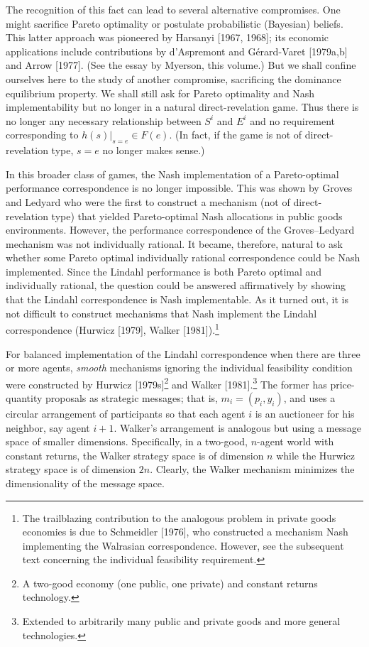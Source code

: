 \documentclass[12pt, letterpaper]{article}
\begin{document}
The recognition of this fact can lead to several alternative compromises. One might sacrifice Pareto optimality or postulate probabilistic (Bayesian) beliefs. This latter approach was pioneered by Harsanyi [1967, 1968]; its economic applications include contributions by d'Aspremont and Gérard-Varet [1979a,b] and Arrow [1977]. (See the essay by Myerson, this volume.) But we shall confine ourselves here to the study of another compromise, sacrificing the dominance equilibrium property. We shall still ask for Pareto optimality and Nash implementability but no longer in a natural direct-revelation game. Thus there is no longer any necessary relationship between $S^i$ and $E^i$ and no requirement corresponding to $h(s)|_{s=e} \in F(e)$. (In fact, if the game is not of direct-revelation type, $s = e$ no longer makes sense.)

In this broader class of games, the Nash implementation of a Pareto-optimal performance correspondence is no longer impossible. This was shown by Groves and Ledyard who were the first to construct a mechanism (not of direct-revelation type) that yielded Pareto-optimal Nash allocations in public goods environments. However, the performance correspondence of the Groves--Ledyard mechanism was not individually rational. It became, therefore, natural to ask whether some Pareto optimal individually rational correspondence could be Nash implemented. Since the Lindahl performance is both Pareto optimal and individually rational, the question could be answered affirmatively by showing that the Lindahl correspondence is Nash implementable. As it turned out, it is not difficult to construct mechanisms that Nash implement the Lindahl correspondence (Hurwicz [1979], Walker [1981]).\footnote{The trailblazing contribution to the analogous problem in private goods economies is due to Schmeidler [1976], who constructed a mechanism Nash implementing the Walrasian correspondence. However, see the subsequent text concerning the individual feasibility requirement.}

For balanced implementation of the Lindahl correspondence when there are three or more agents, \textit{smooth} mechanisms ignoring the individual feasibility condition were constructed by Hurwicz [1979s]\footnote{A two-good economy (one public, one private) and constant returns technology.} and Walker [1981].\footnote{Extended to arbitrarily many public and private goods and more general technologies.} The former has price-quantity proposals as strategic messages; that is, $m_i = (p_i, y_i)$, and uses a circular arrangement of participants so that each agent $i$ is an auctioneer for his neighbor, say agent $i + 1$. Walker's arrangement is analogous but using a message space of smaller dimensions. Specifically, in a two-good, $n$-agent world with constant returns, the Walker strategy space is of dimension $n$ while the Hurwicz strategy space is of dimension $2n$. Clearly, the Walker mechanism minimizes the dimensionality of the message space.
\end{document}
